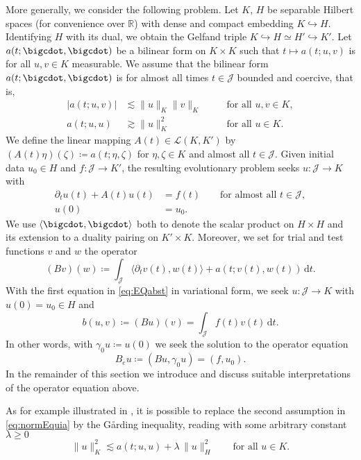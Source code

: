 \documentclass{amsart}
\providecommand{\dt}{\,\mathrm{d}t}
\newcommand{\R}{\mathbb R}
\newcommand{\cJ}{\mathcal J}
\newcommand{\cL}{\mathcal L}
\begin{document}
More generally, we consider the following problem. 
Let $K$, $H$ be separable Hilbert spaces (for convenience over $\R$) with dense and compact embedding $K \hookrightarrow H$. Identifying $H$ with its dual, we obtain the Gelfand triple $K \hookrightarrow H \simeq H' \hookrightarrow K'$. 
%
Let $a(t;\bigcdot,\bigcdot)$ be a bilinear form on $K \times K$ such that $t \mapsto a(t;u,v)$ is for all $u,v\in K$ measurable. We assume that the bilinear form $a(t;\bigcdot,\bigcdot)$ is for almost all times $t \in \cJ$ bounded and coercive, that is,
\begin{equation}\label{eq:normEquia}
\begin{aligned}
|a(t;u,v)| &\lesssim \|u\|_K \|v\|_K &\quad& \text{for all }u,v\in K,\\
a(t;u,u) &\gtrsim \|u\|_K^2&& \text{for all }u\in K.
\end{aligned}
\end{equation}
%
We define the linear mapping $A(t) \in \cL(K,K')$ by $(A(t)\eta)(\zeta)\coloneqq a(t;\eta,\zeta)$ for $\eta,\zeta\in K$ and almost all $t\in \cJ$. Given initial data $u_0 \in H$ and $f\colon \mathcal{J} \to K'$, the resulting evolutionary problem seeks $u\colon \mathcal{J} \to K$ with
\begin{equation}\label{eq:EQabst}
\begin{aligned}
\partial_t u (t)+A(t)u(t)& = f(t) \qquad \text{for almost all }t\in \cJ,\\
u(0) & = u_0.
\end{aligned}
\end{equation}
We use $\langle\bigcdot,\bigcdot\rangle$ both to denote the scalar product on $H \times H$ and its extension to a duality pairing on $K' \times K$. Moreover, we set for trial and test functions $v$ and $w$ the operator
\begin{equation}\label{eq:defB}
(Bv)(w) \coloneqq \int_\cJ \langle \partial_t v(t),w(t)\rangle+a(t;v(t),w(t))\dt.
\end{equation} 
With the first equation in \eqref{eq:EQabst} in variational form, we seek $u \colon  \mathcal{J} \to K$ with $u(0) = u_0 \in H$ and
\begin{equation*}
b(u,v) \coloneqq (Bu)(v) = \int_\mathcal{J} f(t) v(t)\dt.
\end{equation*}
In other words, with $\gamma_0 u\coloneqq u(0)$ we seek  the solution to the operator equation
\begin{equation}\label{eq:defBe}
B_e u\coloneqq (Bu,\gamma_0 u)=(f,u_0).
\end{equation}
In the remainder of this section we introduce and discuss suitable interpretations of the operator equation above.
\begin{remark}
As for example illustrated in \cite[Rem.~65.5]{ErnGuermond21c}, it is possible to replace the second assumption in \eqref{eq:normEquia} by the G\aa rding inequality, reading with some arbitrary constant $\lambda \geq 0$
\begin{equation*}
\|u\|_K^2 \lesssim a(t;u,u) + \lambda\, \lVert u \rVert_H^2\qquad \text{for all }u\in K.
\end{equation*}
\end{remark}
%
\end{document}
